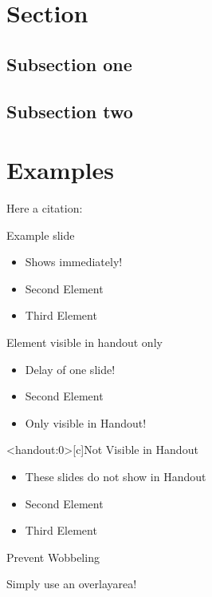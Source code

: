 \section{Section}

\subsection{Subsection one}
\subsection{Subsection two}


\section{Examples}

\begin{frame}[c]
     Here a citation: \cite{benchcpp}
\end{frame}


\begin{frame}[c]{Example slide}
    \Large
    \begin{itemize}[<+->]
        \item Shows immediately!
        \item Second Element
        \item Third Element
    \end{itemize}
\end{frame}


\begin{frame}[c]{Element visible in handout only}
    \Large
    \begin{itemize}[<+(1)->]
        \item Delay of one slide!
        \item Second Element
        \item<handout> Only visible in Handout!
    \end{itemize}
\end{frame}


\begin{frame}<handout:0>[c]{Not Visible in Handout}
    \Large
    \begin{itemize}[<+(1)->]
        \item These slides do not show in Handout
        \item Second Element
        \item Third Element
    \end{itemize}
\end{frame}


\begin{frame}[c]{Prevent Wobbeling}

    Simply use an overlayarea!


\end{frame}



